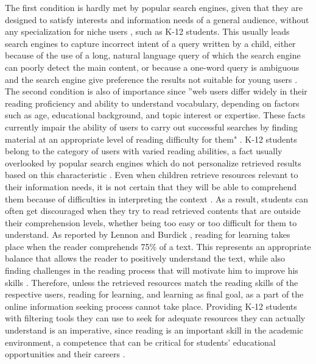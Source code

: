 \documentclass{sig-alternate-05-2015}
\begin{document}
The first condition is hardly met by popular search engines, given that they are designed to satisfy interests and information needs of  a general audience, without any specialization for niche users \cite{Wan13}, such as K-12 students. This usually leads search engines to capture incorrect intent of a query written by a child, either because of the use of a long, natural language query of which the search engine can poorly detect the main content, or because a one-word query is ambiguous and the search engine give preference the results not suitable for young users \cite{Bil13}. 
The second condition is also of importance since ''web users differ widely in their reading proficiency and ability to understand vocabulary, depending on factors such as age, educational background, and topic interest or expertise. These facts currently impair the ability of users to carry out successful searches by finding material at an appropriate level of reading difficulty for them" \cite{Col11}. K-12 students belong to the category of users with varied reading abilities, a fact usually overlooked by popular search engines which do not personalize retrieved results based on this characteristic \cite{Col11}.  Even when children retrieve resources relevant to their information needs, it is not certain that they will be able to comprehend them because of difficulties in interpreting the context \cite{Bil13}. As a result, students can often get discouraged when they try to read retrieved contents that are outside their comprehension levels, whether being too easy or too difficult for them to understand. As reported by Lennon and Burdick \cite{Len04}, reading for learning takes place when the reader comprehends 75\% of a text. This represents an appropriate balance that allows the reader to positively understand the text, while also finding challenges in the reading process that will motivate him to improve his skills \cite{Len04}. Therefore, unless the retrieved resources match the reading skills of the respective users, reading for learning, and learning as final goal, as a part of the online information seeking process cannot take place. Providing K-12 students with filtering tools they can use to seek for adequate resources they can actually understand is an imperative, since reading is an important skill in the academic environment, a competence that can be critical for students' educational opportunities and their careers \cite{Rob00}. 
\end{document}

